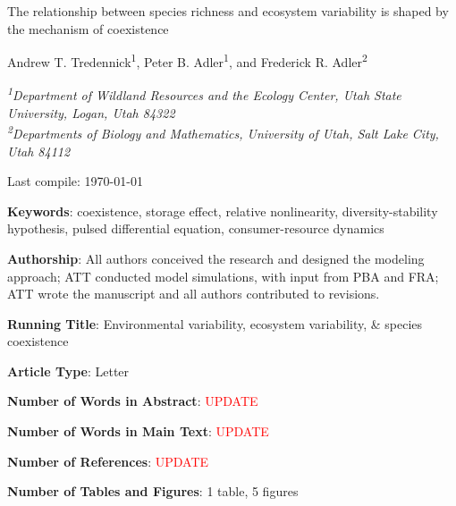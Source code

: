 \documentclass[12pt,]{article}
\title{}
\author{}
\date{}
\begin{document}
\renewcommand\linenumberfont{\normalfont\tiny\sffamily\color{gray}}

 \newcommand{\new}{\textcolor{blue}}

\begin{singlespace}

\begin{centering}

\Large{The relationship between species richness and ecosystem variability is shaped by the mechanism of coexistence}

\bigskip{} \bigskip{}

\renewcommand*{\thefootnote}{\fnsymbol{footnote}}

\normalsize{Andrew T. Tredennick\textsuperscript{1}, Peter B. Adler\textsuperscript{1}, and Frederick R. Adler\textsuperscript{2}}

\bigskip{}

\textit{\small{\textsuperscript{1}Department of Wildland Resources and the Ecology Center, Utah State University, Logan, Utah 84322}} \\
\textit{\small{\textsuperscript{2}Departments of Biology and Mathematics, University of Utah, Salt Lake City, Utah 84112}} 

\end{centering}

\vspace{3em}

Last compile: \today

\noindent \textbf{Keywords}: coexistence, storage effect, relative nonlinearity, diversity-stability hypothesis, pulsed differential equation, consumer-resource dynamics

\noindent \textbf{Authorship}: All authors conceived the research and designed the modeling approach; ATT conducted model simulations, with input from PBA and FRA; ATT wrote the manuscript and all authors contributed to revisions.

\noindent \textbf{Running Title}: Environmental variability, ecosystem variability, \& species coexistence

\noindent \textbf{Article Type}: Letter

\noindent \textbf{Number of Words in Abstract}: \textcolor{red}{UPDATE}

\noindent \textbf{Number of Words in Main Text}: \textcolor{red}{UPDATE}

\noindent \textbf{Number of References}: \textcolor{red}{UPDATE}

\noindent \textbf{Number of Tables and Figures}: 1 table, 5 figures


\end{singlespace}
\end{document}
